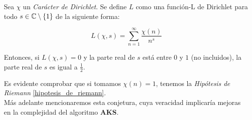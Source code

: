 \begin{conjetura}\label{hipotesis_generalizada_de_riemann}
	Sea $\chi$ un \textit{Carácter de Dirichlet}. Se define $L$ como una función-L de Dirichlet para todo $s \in \mathbb{C} \setminus \{1\}$ de la siguiente forma:
	
	\begin{equation}
	L(\chi, s) = \sum_{n=1}^{\infty}\frac{\chi(n)}{n^s}
	\end{equation}
	
	Entonces, si $L(\chi, s) = 0$ y la parte real de $s$ está entre $0$ y $1$ (no incluidos), la parte real de $s$ es igual a $\frac{1}{2}$.
\end{conjetura}

Es evidente comprobar que si tomamos $\chi(n) = 1$, tenemos la \textit{Hipótesis de Riemann} \ref{hipotesis_de_riemann}.\\

Más adelante mencionaremos esta conjetura, cuya veracidad implicaría mejoras en la complejidad del algoritmo \textbf{AKS}.

\endinput
